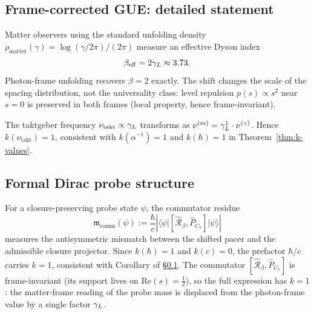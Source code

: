 \subsection{Frame-corrected GUE: detailed statement}
\label{app:gue-frame-reintegrated}

\begin{proposition}
Matter observers using the standard unfolding density
$\rho_{\mathrm{matter}}(\gamma)=\log(\gamma/2\pi)/(2\pi)$
measure an effective Dyson index
\[
  \beta_{\mathrm{eff}} = 2\gamma_L\approx 3.73.
\]
Photon-frame unfolding recovers $\beta=2$ exactly.
The shift changes the scale of the spacing distribution, not the
universality class: level repulsion $p(s)\propto s^2$ near $s=0$ is
preserved in both frames (local property, hence frame-invariant).
\end{proposition}

\begin{corollary}
The taktgeber frequency $\nu_{\mathrm{takt}}\propto\gamma_L$
transforms as $\nu^{(m)}=\gamma_L^1\cdot\nu^{(\gamma)}$.
Hence $k(\nu_{\mathrm{takt}})=1$, consistent with $k(\alpha^{-1})=1$
and $k(\hbar)=1$ in Theorem~\ref{thm:k-values}.
\end{corollary}

\subsection{Formal Dirac probe structure}
\label{app:dirac-formal-reintegrated}

\begin{definition}
For a closure-preserving probe state $\psi$, the commutator residue
\[
  \mathfrak{m}_{\mathrm{comm}}(\psi)
  := \frac{\hbar}{c}
     \left|
     \bigl\langle\psi\big|
     [\hat{\mathcal{R}}_\beta,\hat P_{C_7}]
     \big|\psi\bigr\rangle
     \right|
\]
measures the antisymmetric mismatch between the shifted pacer and the
admissible closure projector.
Since $k(\hbar)=1$ and $k(c)=0$, the prefactor $\hbar/c$ carries
$k=1$, consistent with Corollary of \S\ref{app:gue-frame-reintegrated}.
The commutator $[\hat{\mathcal{R}}_\beta,\hat P_{C_7}]$ is
frame-invariant (its support lives on $\mathrm{Re}(s)=\tfrac{1}{2}$),
so the full expression has $k=1$: the matter-frame reading of the probe
mass is displaced from the photon-frame value by a single factor $\gamma_L$.
\end{definition}

